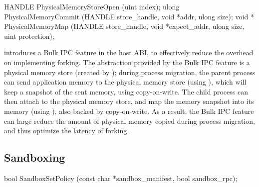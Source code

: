 \begin{paldef}
HANDLE PhysicalMemoryStoreOpen (uint index);
ulong  PhysicalMemoryCommit (HANDLE store_handle,
                            void *addr, ulong size);
void * PhysicalMemoryMap (HANDLE store_handle,
                          void *expect_addr, ulong size,
                          uint protection);
\end{paldef}


\graphene{} introduces a Bulk IPC feature in the host ABI, to effectively reduce the overhead on implementing forking.
The abstraction provided by the Bulk IPC feature
is a physical memory store (created by );
during process migration, the parent process
can send application memory to the physical memory store (using ), which will keep a snapshot of the sent memory, using copy-on-write.
The child process can then attach to the physical memory store,
and map the memory snapshot into its memory (using ), also backed by copy-on-write.
As a result, the Bulk IPC feature can large reduce the amount of physical memory copied during process migration,
and thus optimize the latency of forking.




\subsection*{Sandboxing}


\begin{paldef}
bool SandboxSetPolicy (const char *sandbox_manifest,
                       bool sandbox_rpc);
\end{paldef}



